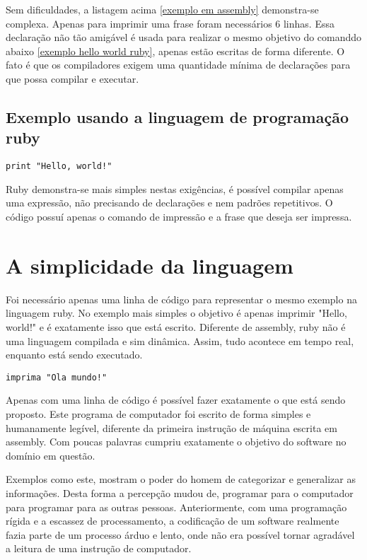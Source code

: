 \documentclass[espaco=simples,appendix=Name]{abnt}
\begin{document}
Sem dificuldades, a listagem acima \ref{exemplo em assembly} demonstra-se complexa. Apenas para imprimir uma frase foram necessários 6 linhas. Essa declaração não tão amigável é usada para realizar o mesmo objetivo do comanddo abaixo \ref{exemplo hello world ruby}, apenas estão escritas de forma diferente. O fato é que os compiladores exigem uma quantidade mínima de declarações para que possa compilar e executar.


\subsection {Exemplo usando a linguagem de programação ruby}

\begin{lstlisting}[caption=Exemplo em ruby]
   print "Hello, world!"
\end{lstlisting}

 Ruby demonstra-se mais simples nestas exigências, é possível compilar apenas uma expressão, não precisando de declarações e nem padrões repetitivos. O código possuí apenas o comando de impressão e a frase que deseja ser impressa.

\section { A simplicidade da linguagem }

Foi necessário apenas uma linha de código para representar o mesmo exemplo na linguagem ruby. No exemplo mais simples o objetivo é apenas imprimir "Hello, world!" e é exatamente isso que está escrito. Diferente de assembly, ruby não é uma linguagem compilada e sim dinâmica. Assim, tudo acontece em tempo real, enquanto está sendo executado.
   
\begin{lstlisting}[caption=Tradução do programa ruby]
   imprima "Ola mundo!"
\end{lstlisting}

Apenas com uma linha de código é possível fazer exatamente o que está sendo proposto. Este programa de computador foi escrito de forma simples e humanamente legível, diferente da primeira instrução de máquina escrita em assembly. Com poucas palavras cumpriu exatamente o objetivo do software no domínio em questão.

Exemplos como este, mostram o poder do homem de categorizar e generalizar as informações. Desta forma a percepção mudou de, programar para o computador para programar para as outras pessoas. Anteriormente, com uma programação rígida e a escassez de processamento, a codificação de um software realmente fazia parte de um processo árduo e lento, onde não era possível tornar agradável a leitura de uma instrução de computador.
\end{document}
